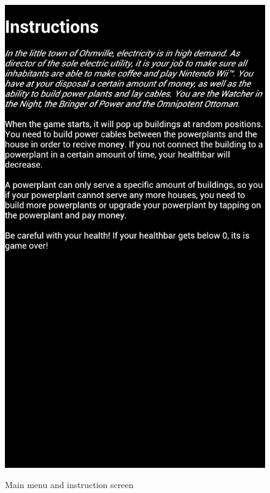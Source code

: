 \begin{figure}[H]
{		\includegraphics[scale=0.17]{pictures/sprint2-screen/sprint2-3}
	}
	\caption{Main menu and instruction screen}
	\end{figure}

